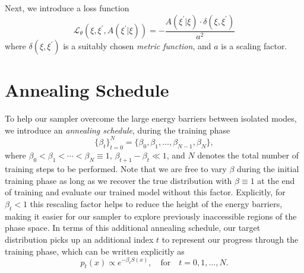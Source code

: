 \documentclass{article} %
\begin{document}
{Next, we introduce a loss function
%
\begin{equation}
   \mathcal{L}_{\theta}{\left(\xi, \xi^{\prime}, A(\xi^{\prime}|\xi)\right)}
      = -\frac{A(\xi^{\prime}|\xi)\cdot \delta(\xi, \xi^{\prime})}{a^{2}}
\end{equation}
%
where \(\delta(\xi, \xi^{\prime})\) is a suitably chosen \emph{metric function}, and \(a\) is a scaling factor.
%
\section{\label{sec:annealing_schedule}Annealing Schedule}
%
To help our sampler overcome the large energy barriers between isolated modes, we introduce an \emph{annealing
schedule}, during the training phase
%
\begin{equation}
   {\{\beta_{t}\}}_{t=0}^{N} = \{\beta_{0}, \beta_{1}, \ldots, \beta_{N-1}, \beta_{N}\},
\end{equation}
%
where \(\beta_{0} < \beta_{1} < \cdots < \beta_{N} \equiv 1\), \(\beta_{t+1} - \beta_{t} \ll 1\), and \(N\) denotes the
total number of training steps to be performed.
%
Note that we are free to vary \(\beta\) during the initial training phase as long as we recover the true distribution
with \(\beta \equiv 1\) at the end of training and evaluate our trained model without this factor.
%
Explicitly, for \(\beta_{t} < 1\) this rescaling factor helps to reduce the height of the energy barriers, making it
easier for our sampler to explore previously inaccessible regions of the phase space.
%
In terms of this additional annealing schedule, our target distribution picks up an additional index \(t\) to represent
our progress through the training phase, which can be written explicitly as  
%
\begin{equation}
   p_{t}(x)\propto e^{-\beta_{t} S(x)}, \quad\text{for}\quad t = 0, 1, \ldots, N.
\end{equation}
%

}
\end{document}
